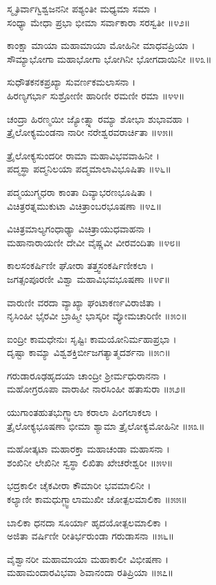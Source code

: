ಸ್ಮೃತಿರ್ವಾಗ್ವಿಶ್ವಜನನೀ ಪಶ್ಯಂತೀ ಮಧ್ಯಮಾ ಸಮಾ ।\\
ಸಂಧ್ಯಾ ಮೇಧಾ ಪ್ರಭಾ ಭೀಮಾ ಸರ್ವಾಕಾರಾ ಸರಸ್ವತೀ ॥೪೨॥

ಕಾಂಕ್ಷಾ ಮಾಯಾ ಮಹಾಮಾಯಾ ಮೋಹಿನೀ ಮಾಧವಪ್ರಿಯಾ ।\\
ಸೌಮ್ಯಾಭೋಗಾ ಮಹಾಭೋಗಾ ಭೋಗಿನೀ ಭೋಗದಾಯಿನೀ ॥೪೩॥

ಸುಧೌತಕನಕಪ್ರಖ್ಯಾ ಸುವರ್ಣಕಮಲಾಸನಾ ।\\
ಹಿರಣ್ಯಗರ್ಭಾ ಸುಶ್ರೋಣೀ ಹಾರಿಣೀ ರಮಣೀ ರಮಾ ॥೪೪॥

ಚಂದ್ರಾ ಹಿರಣ್ಮಯೀ ಜ್ಯೋತ್ಸ್ನಾ ರಮ್ಯಾ ಶೋಭಾ ಶುಭಾವಹಾ ।\\
ತ್ರೈಲೋಕ್ಯಮಂಡನಾ ನಾರೀ ನರೇಶ್ವರವರಾರ್ಚಿತಾ ॥೪೫॥

ತ್ರೈಲೋಕ್ಯಸುಂದರೀ ರಾಮಾ ಮಹಾವಿಭವವಾಹಿನೀ ।\\
ಪದ್ಮಸ್ಥಾ ಪದ್ಮನಿಲಯಾ ಪದ್ಮಮಾಲಾವಿಭೂಷಿತಾ ॥೪೬॥

ಪದ್ಮಯುಗ್ಮಧರಾ ಕಾಂತಾ ದಿವ್ಯಾಭರಣಭೂಷಿತಾ ।\\
ವಿಚಿತ್ರರತ್ನಮುಕುಟಾ ವಿಚಿತ್ರಾಂಬರಭೂಷಣಾ ॥೪೭॥

ವಿಚಿತ್ರಮಾಲ್ಯಗಂಧಾಢ್ಯಾ ವಿಚಿತ್ರಾಯುಧವಾಹನಾ ।\\
ಮಹಾನಾರಾಯಣೀ ದೇವೀ ವೈಷ್ಣವೀ ವೀರವಂದಿತಾ ॥೪೮॥

ಕಾಲಸಂಕರ್ಷಿಣೀ ಘೋರಾ ತತ್ತ್ವಸಂಕರ್ಷಿಣೀಕಲಾ ।\\
ಜಗತ್ಸಂಪೂರಣೀ ವಿಶ್ವಾ ಮಹಾವಿಭವಭೂಷಣಾ ॥೪೯॥

ವಾರುಣೀ ವರದಾ ವ್ಯಾಖ್ಯಾ ಘಂಟಾಕರ್ಣವಿರಾಜಿತಾ ।\\
ನೃಸಿಂಹೀ ಭೈರವೀ ಬ್ರಾಹ್ಮೀ ಭಾಸ್ಕರೀ ವ್ಯೋಮಚಾರಿಣೀ ॥೫೦॥

ಐಂದ್ರೀ ಕಾಮಧೇನುಃ ಸೃಷ್ಟಿಃ ಕಾಮಯೋನಿರ್ಮಹಾಪ್ರಭಾ ।\\
ದೃಷ್ಟಾ ಕಾಮ್ಯಾ ವಿಶ್ವಶಕ್ತಿರ್ಬೀಜಗತ್ಯಾತ್ಮದರ್ಶನಾ ॥೫೧॥

ಗರುಡಾರೂಢಹೃದಯಾ ಚಾಂದ್ರೀ ಶ್ರೀರ್ಮಧುರಾನನಾ ।\\
ಮಹೋಗ್ರರೂಪಾ ವಾರಾಹೀ ನಾರಸಿಂಹೀ ಹತಾಸುರಾ ॥೫೨॥

ಯುಗಾಂತಹುತಭುಗ್ಜ್ವಾಲಾ ಕರಾಲಾ ಪಿಂಗಲಾಕಲಾ ।\\
ತ್ರೈಲೋಕ್ಯಭೂಷಣಾ ಭೀಮಾ ಶ್ಯಾಮಾ ತ್ರೈಲೋಕ್ಯಮೋಹಿನೀ ॥೫೩॥

ಮಹೋತ್ಕಟಾ ಮಹಾರಕ್ತಾ ಮಹಾಚಂಡಾ ಮಹಾಸನಾ ।\\
ಶಂಖಿನೀ ಲೇಖಿನೀ ಸ್ವಸ್ಥಾ ಲಿಖಿತಾ ಖೇಚರೇಶ್ವರೀ ॥೫೪॥

ಭದ್ರಕಾಲೀ ಚೈಕವೀರಾ ಕೌಮಾರೀ ಭವಮಾಲಿನೀ ।\\
ಕಲ್ಯಾಣೀ ಕಾಮಧುಗ್ಜ್ವಾಲಾಮುಖೀ ಚೋತ್ಪಲಮಾಲಿಕಾ ॥೫೫॥

ಬಾಲಿಕಾ ಧನದಾ ಸೂರ್ಯಾ ಹೃದಯೋತ್ಪಲಮಾಲಿಕಾ ।\\
ಅಜಿತಾ ವರ್ಷಿಣೀ ರೀತಿರ್ಭರುಂಡಾ ಗರುಡಾಸನಾ ॥೫೬॥

ವೈಶ್ವಾನರೀ ಮಹಾಮಾಯಾ ಮಹಾಕಾಲೀ ವಿಭೀಷಣಾ ।\\
ಮಹಾಮಂದಾರವಿಭವಾ ಶಿವಾನಂದಾ ರತಿಪ್ರಿಯಾ ॥೫೭॥

